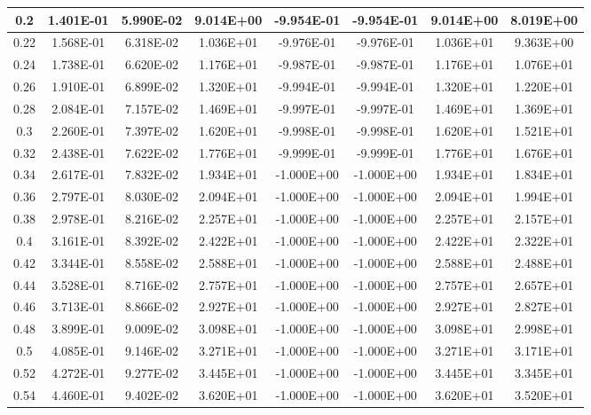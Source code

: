 \documentclass{article}
\begin{document}
\begin{center}
\begin{longtable}{|c|c|c|c|c|c|c|c|}
        0.2 & 1.401E-01 & 5.990E-02 & 9.014E+00 & -9.954E-01 & -9.954E-01 & 9.014E+00 & 8.019E+00 \\ \hline
        0.22 & 1.568E-01 & 6.318E-02 & 1.036E+01 & -9.976E-01 & -9.976E-01 & 1.036E+01 & 9.363E+00 \\ \hline
        0.24 & 1.738E-01 & 6.620E-02 & 1.176E+01 & -9.987E-01 & -9.987E-01 & 1.176E+01 & 1.076E+01 \\ \hline
        0.26 & 1.910E-01 & 6.899E-02 & 1.320E+01 & -9.994E-01 & -9.994E-01 & 1.320E+01 & 1.220E+01 \\ \hline
        0.28 & 2.084E-01 & 7.157E-02 & 1.469E+01 & -9.997E-01 & -9.997E-01 & 1.469E+01 & 1.369E+01 \\ \hline
        0.3 & 2.260E-01 & 7.397E-02 & 1.620E+01 & -9.998E-01 & -9.998E-01 & 1.620E+01 & 1.521E+01 \\ \hline
        0.32 & 2.438E-01 & 7.622E-02 & 1.776E+01 & -9.999E-01 & -9.999E-01 & 1.776E+01 & 1.676E+01 \\ \hline
        0.34 & 2.617E-01 & 7.832E-02 & 1.934E+01 & -1.000E+00 & -1.000E+00 & 1.934E+01 & 1.834E+01 \\ \hline
        0.36 & 2.797E-01 & 8.030E-02 & 2.094E+01 & -1.000E+00 & -1.000E+00 & 2.094E+01 & 1.994E+01 \\ \hline
        0.38 & 2.978E-01 & 8.216E-02 & 2.257E+01 & -1.000E+00 & -1.000E+00 & 2.257E+01 & 2.157E+01 \\ \hline
        0.4 & 3.161E-01 & 8.392E-02 & 2.422E+01 & -1.000E+00 & -1.000E+00 & 2.422E+01 & 2.322E+01 \\ \hline
        0.42 & 3.344E-01 & 8.558E-02 & 2.588E+01 & -1.000E+00 & -1.000E+00 & 2.588E+01 & 2.488E+01 \\ \hline
        0.44 & 3.528E-01 & 8.716E-02 & 2.757E+01 & -1.000E+00 & -1.000E+00 & 2.757E+01 & 2.657E+01 \\ \hline
        0.46 & 3.713E-01 & 8.866E-02 & 2.927E+01 & -1.000E+00 & -1.000E+00 & 2.927E+01 & 2.827E+01 \\ \hline
        0.48 & 3.899E-01 & 9.009E-02 & 3.098E+01 & -1.000E+00 & -1.000E+00 & 3.098E+01 & 2.998E+01 \\ \hline
        0.5 & 4.085E-01 & 9.146E-02 & 3.271E+01 & -1.000E+00 & -1.000E+00 & 3.271E+01 & 3.171E+01 \\ \hline
        0.52 & 4.272E-01 & 9.277E-02 & 3.445E+01 & -1.000E+00 & -1.000E+00 & 3.445E+01 & 3.345E+01 \\ \hline
        0.54 & 4.460E-01 & 9.402E-02 & 3.620E+01 & -1.000E+00 & -1.000E+00 & 3.620E+01 & 3.520E+01 \\ \hline

\end{longtable}
\end{center}
\end{document}
